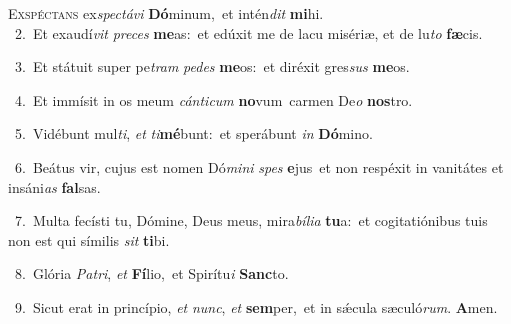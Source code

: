 \lettrine{\initial\textcolor{\initialcolor}{E}}{xspéctans} ex\-\textit{spec}\-\textit{tá}\textit{vi} \textbf{Dó}\-minum,~\star et intén\textit{dit} \textbf{mi}\-hi.\\
{\numbfont\textcolor{\numbcolor}{~2.}}~Et exaudí\textit{vit} \textit{pre}\-\textit{ces} \textbf{me}\-as:~\star et edúxit me de lacu misériæ, et de lu\textit{to} \textbf{fæ}\-cis.\par
{\numbfont\textcolor{\numbcolor}{~3.}}~Et státuit super pe\textit{tram} \textit{pe}\-\textit{des} \textbf{me}\-os:~\star et diréxit gres\textit{sus} \textbf{me}\-os.\par
{\numbfont\textcolor{\numbcolor}{~4.}}~Et immísit in os meum \textit{cán}\-\textit{ti}\textit{cum} \textbf{no}\-vum~\star carmen De\textit{o} \textbf{nos}\-tro.\par
{\numbfont\textcolor{\numbcolor}{~5.}}~Vidébunt mul\-\textit{ti}\-, \textit{et} \textit{ti}\-\textbf{mé}bunt:~\star et sperábunt \textit{in} \textbf{Dó}\-mino.\par
{\numbfont\textcolor{\numbcolor}{~6.}}~Beátus vir, cujus est nomen Dó\-\textit{mi}\-\textit{ni} \textit{spes} \textbf{e}\-jus~\star et non respéxit in vanitátes et insáni\textit{as} \textbf{fal}\-sas.\par
{\numbfont\textcolor{\numbcolor}{~7.}}~Multa fecísti tu, Dómine, Deus meus, mira\-\textit{bí}\-\textit{li}\textit{a} \textbf{tu}\-a:~\star et cogitatiónibus tuis non est qui símilis \textit{sit} \textbf{ti}\-bi.\par
{\numbfont\textcolor{\numbcolor}{~8.}}~Glória \textit{Pa}\-\textit{tri}, \textit{et} \textbf{Fí}\-lio,~\star et Spirítu\textit{i} \textbf{Sanc}\-to.\par
{\numbfont\textcolor{\numbcolor}{~9.}}~Sicut erat in princípio, \textit{et} \textit{nunc}\-, \textit{et} \textbf{sem}\-per,~\star et in sǽcula sæculó\-\textit{rum}\-. \textbf{A}\-men.\par
